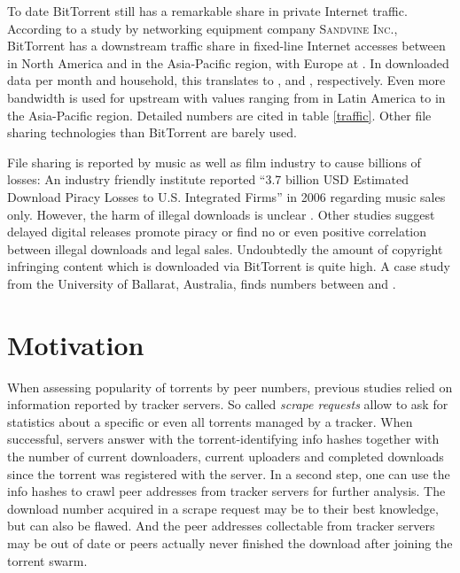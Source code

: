 \documentclass[10pt, a4paper, twoside=false, headsepline]{scrbook}
\renewcommand{\_}{\origunderscore\allowbreak}
\begin{document}
To date BitTorrent still has a remarkable share in private Internet traffic. According to a study \cite{sandvine2014} by networking equipment company \textsc{Sandvine Inc.}, BitTorrent has a downstream traffic share in fixed-line Internet accesses between  in North America and  in the Asia-Pacific region, with Europe at . In downloaded data per month and household, this translates to ,  and , respectively. Even more bandwidth is used for upstream with values ranging from  in Latin America to  in the Asia-Pacific region. Detailed numbers are cited in table \ref{traffic}. Other file sharing technologies than BitTorrent are barely used.

File sharing is reported by music as well as film industry to cause billions of losses: An industry friendly institute reported ``3.7 billion USD Estimated Download Piracy Losses to U.S. Integrated Firms'' \cite[table~1]{siwek2007true} in 2006 regarding music sales only. However, the harm of illegal downloads is unclear \cite{hammond2014profit}. Other studies suggest delayed digital releases promote piracy \cite{danaher2012reel} or find no \cite{mckenzie2009illegal} or even positive \cite{smith2010piracy} correlation between illegal downloads and legal sales. Undoubtedly the amount of copyright infringing content which is downloaded via BitTorrent is quite high. A case study \cite{watters2011much} from the University of Ballarat, Australia, finds numbers between  and .

\section{Motivation}
When assessing popularity of torrents by peer numbers, previous studies relied on information reported by tracker servers. So called \emph{scrape requests} allow to ask for statistics about a specific or even all torrents managed by a tracker. When successful, servers answer with the torrent-identifying info hashes together with the number of current downloaders, current uploaders and completed downloads since the torrent was registered with the server. In a second step, one can use the info hashes to crawl peer addresses from tracker servers for further analysis. The download number acquired in a scrape request may be to their best knowledge, but can also be flawed. And the peer addresses collectable from tracker servers may be out of date or peers actually never finished the download after joining the torrent swarm.
\end{document}
